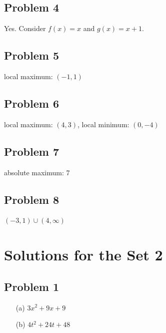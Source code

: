 \documentclass[12pt]{article}
\begin{document}
\subsection*{Problem 4}
Yes. Consider \(f(x)=x\) and \(g(x)=x+1\).
\subsection*{Problem 5}
local maximum: \((-1,1)\)
\subsection*{Problem 6}
local maximum: \((4,3)\), local minimum: \((0,-4)\)
\subsection*{Problem 7}
absolute maximum: 7
\subsection*{Problem 8}
\((-3,1)\cup (4,\infty)\)

\section*{Solutions for the Set 2}
\subsection*{Problem 1}
\begin{enumerate}
    \item[(a)] \(3x^2+9x+9\)
    \item[(b)] \(4t^2+24t+48\)
\end{enumerate}
\end{document}
